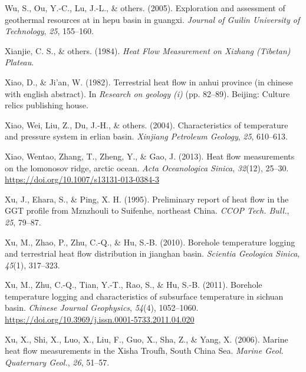 \documentclass[draft,linenumbers]{agujournal2018}
\begin{document}
\leavevmode{}%
Wu, S., Ou, Y.-C., Lu, J.-L., \& others. (2005). Exploration and
assessment of geothermal resources at in hepu basin in guangxi.
\emph{Journal of Guilin University of Technology}, \emph{25}, 155--160.

\leavevmode{}%
Xianjie, C. S., \& others. (1984). \emph{Heat Flow Measurement on
Xizhang (Tibetan) Plateau}.

\leavevmode{}%
Xiao, D., \& Ji'an, W. (1982). Terrestrial heat flow in anhui province
(in chinese with english abstract). In \emph{Research on geology (i)}
(pp. 82--89). Beijing: Culture relics publishing house.

\leavevmode{}%
Xiao, Wei, Liu, Z., Du, J.-H., \& others. (2004). Characteristics of
temperature and pressure system in erlian basin. \emph{Xinjiang
Petroleum Geology}, \emph{25}, 610--613.

\leavevmode{}%
Xiao, Wentao, Zhang, T., Zheng, Y., \& Gao, J. (2013). Heat flow
measurements on the lomonosov ridge, arctic ocean. \emph{Acta
Oceanologica Sinica}, \emph{32}(12), 25--30.
\url{https://doi.org/10.1007/s13131-013-0384-3}

\leavevmode{}%
Xu, J., Ehara, S., \& Ping, X. H. (1995). Preliminary report of heat
flow in the {GGT} profile from {Mznzhouli to Suifenhe, northeast China}.
\emph{CCOP Tech. Bull.}, \emph{25}, 79--87.

\leavevmode{}%
Xu, M., Zhao, P., Zhu, C.-Q., \& Hu, S.-B. (2010). Borehole temperature
logging and terrestrial heat flow distribution in jianghan basin.
\emph{Scientia Geologica Sinica}, \emph{45}(1), 317--323.

\leavevmode{}%
Xu, M., Zhu, C.-Q., Tian, Y.-T., Rao, S., \& Hu, S.-B. (2011). Borehole
temperature logging and characteristics of subsurface temperature in
sichuan basin. \emph{Chinese Journal Geophysics}, \emph{54}(4),
1052--1060. \url{https://doi.org/10.3969/j.issn.0001-5733.2011.04.020}

\leavevmode{}%
Xu, X., Shi, X., Luo, X., Liu, F., Guo, X., Sha, Z., \& Yang, X. (2006).
Marine heat flow measurements in the {Xisha Troufh, South China Sea}.
\emph{Marine Geol. Quaternary Geol.}, \emph{26}, 51--57.
\end{document}
